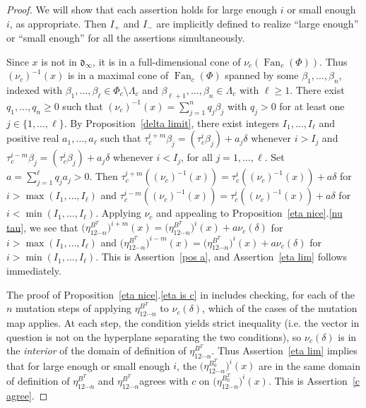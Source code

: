 \documentclass{amsart}
\theoremstyle{definition}
\theoremstyle{remark}
\numberwithin{equation}{section}
\newcommand{\set}[1]{{\lbrace #1 \rbrace}}
\newcommand{\0}{{\mathbf{0}}}
\newcommand{\Fan}{\operatorname{Fan}}
\renewcommand{\d}{{\mathfrak d}}
\newcommand{\RSChar}{\Phi}
\newcommand{\RS}{\RSChar}
\newcommand{\AP}[1]{\RS_{#1}}
\newcommand{\APTChar}{\Lambda}
\newcommand{\APT}[1]{\APTChar_{#1}}
\begin{document}
\begin{proof}
We will show that each assertion holds for large enough $i$ or small enough~$i$, as appropriate.
Then $I_+$ and $I_-$ are implicitly defined to realize ``large enough'' or ``small enough'' for all the assertions simultaneously.

Since $x$ is not in $\d_\infty$, it is in a full-dimensional cone of $\nu_c(\Fan_c(\RS))$.
Thus $(\nu_c)^{-1}(x)$ is in a maximal cone of $\Fan_c(\RS)$ spanned by some $\beta_1,\ldots,\beta_n$, indexed with $\beta_1,\ldots,\beta_\ell\in\AP{c}\setminus\APT{c}$ and $\beta_{\ell+1},\ldots,\beta_n\in\APT{c}$ with $\ell\ge1$.
There exist $q_1,\ldots,q_n\ge0$ such that $(\nu_c)^{-1}(x)=\sum_{j=1}^nq_j\beta_j$ with $q_j>0$ for at least one $j\in\set{1,\ldots,\ell}$.
By Proposition~\ref{delta limit}, there exist integers $I_1,\ldots,I_\ell$ and positive real $a_1,\ldots,a_\ell$ such that $\tau_c^{i+m}\beta_j=(\tau_c^i\beta_j)+a_j\delta$ whenever $i>I_j$ and $\tau_c^{i-m}\beta_j=(\tau_c^i\beta_j)+a_j\delta$ whenever $i<I_j$, for all $j=1,\ldots,\ell$.
Set $a=\sum_{j=1}^\ell q_ja_j>0$.
Then $\tau_c^{i+m}((\nu_c)^{-1}(x))=\tau_c^i((\nu_c)^{-1}(x))+a\delta$ for $i>\max(I_1,\ldots,I_\ell)$ and $\tau_c^{i-m}((\nu_c)^{-1}(x))=\tau_c^i((\nu_c)^{-1}(x))+a\delta$ for $i<\min(I_1,\ldots,I_\ell)$.
Applying $\nu_c$ and appealing to Proposition~\ref{eta nice}.\ref{nu tau}, we see that $\bigl(\eta_{12\cdots n}^{B^T}\bigr)^{i+m}(x)=\bigl(\eta_{12\cdots n}^{B^T}\bigr)^i(x)+a\nu_c(\delta)$ for $i>\max(I_1,\ldots,I_\ell)$ and $\bigl(\eta_{12\cdots n}^{B^T}\bigr)^{i-m}(x)=\bigl(\eta_{12\cdots n}^{B^T}\bigr)^i(x)+a\nu_c(\delta)$ for $i>\min(I_1,\ldots,I_\ell)$.
This is Assertion~\ref{pos a}, and Assertion~\ref{eta lim} follows immediately.

The proof of Proposition~\ref{eta nice}.\ref{eta is c} in \cite[Proposition~7.31]{affscat} includes checking, for each of the $n$ mutation steps of applying $\eta^{B^T}_{12\cdots n}$ to $\nu_c(\delta)$, which of the cases of the mutation map applies.
At each step, the condition yields strict inequality (i.e. the vector in question is not on the hyperplane separating the two conditions), so $\nu_c(\delta)$ is in the \emph{interior} of the domain of definition of $\eta^{B^T}_{12\cdots n}$.
Thus Assertion~\ref{eta lim} implies that for large enough or small enough $i$, the $\bigl(\eta_{12\cdots n}^{B_0^T}\bigr)^i(x)$ are in the same domain of definition of $\eta^{B^T}_{12\cdots n}$ and $\eta^{B^T}_{12\cdots n}$agrees with $c$ on $\bigl(\eta_{12\cdots n}^{B_0^T}\bigr)^i(x)$.
This is Assertion~\ref{c agree}.


\end{proof}
\end{document}
